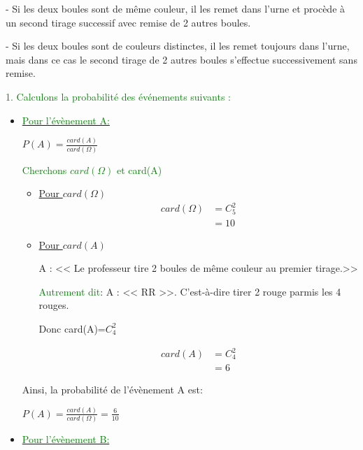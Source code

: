 \documentclass[12pt]{article}
\begin{document}
- Si les deux boules sont de même couleur, il les remet dans l’urne et procède à un second tirage successif avec remise de 2 autres boules.

- Si les deux boules sont de couleurs distinctes, il les remet toujours dans l’urne, mais dans ce cas le second tirage de 2 autres boules s’effectue successivement sans remise.

\textcolor{green}{1. Calculons la probabilité des événements suivants :}

\begin{itemize}
\item \underline{\textcolor{green}{Pour l'évènement A:}}

$P(A)=\frac{card(A)}{card(\Omega)}$

\textcolor{green}{Cherchons $card(\Omega)$ et card(A)}
	\begin{itemize}
	\item \underline{Pour $card(\Omega)$}
	\begin{align*}
	card(\Omega)&=C_{5}^{2}\\
			&=10
	\end{align*}
	
	\begin{center}
		\textcolor{blue}{}
	\end{center}
	\item \underline{Pour $card(A)$}
	
		A : << Le professeur tire 2 boules de même couleur au premier tirage.>>

		\textcolor{green}{Autrement dit}: A : << RR >>. C'est-à-dire tirer 2 rouge parmis les 4 rouges.

		Donc card(A)=$C_{4}^{2}$

		\begin{align*}
			card(A)&=C_{4}^{2}\\
					&=6
		\end{align*}

		\begin{center}
			\textcolor{blue}{}
		\end{center}
	\end{itemize}
	Ainsi, la probabilité de l'évènement A est:

	$P(A)=\frac{card(A)}{card(\Omega)}=\frac{6}{10}$
		\begin{center}
			\textcolor{green}{}
		\end{center}
\item \underline{\textcolor{green}{Pour l'évènement B:}}


\end{itemize}
\end{document}
